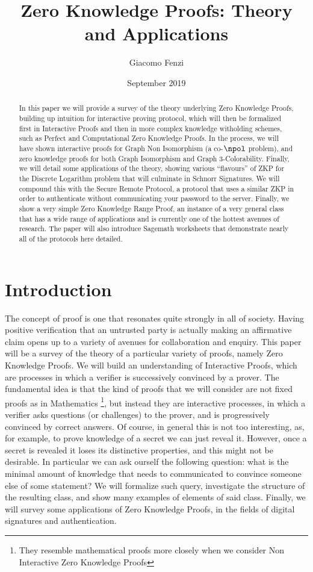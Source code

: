 \documentclass{article}
\title{Zero Knowledge Proofs: Theory and Applications}
\author{Giacomo Fenzi}
\date{September 2019}
\begin{document}
\maketitle

\begin{abstract}
    In this paper we will provide a survey of the theory underlying Zero Knowledge Proofs,
    building up intuition for interactive proving protocol, which will then be formalized first in Interactive Proofs
    and then in more complex knowledge witholding schemes, such as Perfect and Computational Zero Knowledge Proofs.
    In the process, we will have shown interactive proofs for Graph Non Isomorphism (a co-$\npol$ problem),
    and zero knowledge proofs for both Graph Isomorphism and Graph 3-Colorability.
    Finally, we will detail some applications of the theory, showing various \enquote{flavours} of ZKP for the Discrete Logarithm problem that will culminate in
    Schnorr Signatures. We will compound this with the Secure Remote Protocol, a protocol that uses a similar ZKP in order
    to authenticate without communicating your password to the server. Finally, we show a very simple Zero Knowledge
    Range Proof, an instance of a very general class that has a wide range of applications and is currently one of the hottest avenues of research.
    The paper will also introduce Sagemath worksheets that demonstrate nearly all of the protocols here detailed.
\end{abstract}

\tableofcontents

\section{Introduction}
The concept of proof is one that resonates quite strongly in all of society. Having positive verification that
an untrusted party is actually making an affirmative claim opens up to a variety of avenues for collaboration and
enquiry. This paper will be a survey of the theory of a particular variety of proofs, namely Zero Knowledge Proofs.
We will build an understanding of Interactive Proofs, which are processes in which a verifier is successively convinced
by a prover. The fundamental idea is that the kind of proofs that we will consider are not fixed proofs as in Mathematics
\footnote{They resemble mathematical proofs more closely when we consider Non Interactive Zero Knowledge Proofs},
but instead they are interactive processes, in which a verifier asks questions (or challenges) to the prover, and is progressively
convinced by correct answers. Of course, in general this is not too interesting, as, for example, to prove knowledge of a
secret we can just reveal it. However, once a secret is revealed it loses its distinctive properties, and this might not be
desirable. In particular we can ask ourself the following question:
what is the minimal amount of knowledge that needs to communicated to convince someone else of some statement?
We will formalize such query, investigate the structure of the resulting class, and show many examples of elements of said class.
Finally, we will survey some applications of Zero Knowledge Proofs, in the fields of digital signatures and authentication.
\end{document}
